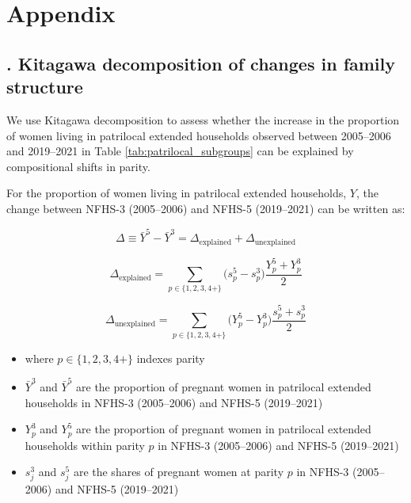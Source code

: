 \documentclass[10pt,twoside,reqno]{article}
\begin{document}
\section*{Appendix}

\setcounter{section}{0}
\renewcommand{\thesection}{\Alph{section}}

\setcounter{equation}{0}
\renewcommand{\theequation}{\thesection-\arabic{equation}}
\setcounter{figure}{0}
\renewcommand{\thefigure}{\thesection-\arabic{figure}}
\setcounter{table}{0}
\renewcommand{\thetable}{\thesection-\arabic{table}}

\subsection*{\thesection. Kitagawa decomposition of changes in family structure}
\label{sec:decomposition_parity}
We use Kitagawa decomposition \citep{kitagawa1955components} to assess whether the increase in the proportion of women living in patrilocal extended households observed between 2005--2006 and 2019--2021 in Table \ref{tab:patrilocal_subgroups} can be explained by compositional shifts in parity. 

For the proportion of women living in patrilocal extended households, $Y$, the change between NFHS-3 (2005--2006) and NFHS-5 (2019--2021) can be written as:

\begin{equation}
\Delta \equiv \bar Y^{5} - \bar Y^{3}
= \Delta_{\text{explained}} + \Delta_{\text{unexplained}}
\end{equation}

\begin{equation}
\Delta_{\text{explained}} =
\sum_{p \in \{1,2,3,4+\}} \big(s_p^{5} - s_p^{3}\big)\frac{Y_p^{5} + Y_p^{3}}{2}
\end{equation}

\begin{equation}
\Delta_{\text{unexplained}} =
\sum_{p \in \{1,2,3,4+\}} \big(Y_p^{5} - Y_p^{3}\big)\frac{s_p^{5} + s_p^{3}}{2}
\end{equation}



\begin{itemize}
    \item where $p \in \{1,2,3,4+\}$ indexes parity
    \item $\bar Y^{3}$ and $\bar Y^{5}$ are the proportion of pregnant women in patrilocal extended households in NFHS-3 (2005--2006) and NFHS-5 (2019--2021)
    \item $Y_p^{3}$ and $Y_p^{5}$ are the proportion of pregnant women in patrilocal extended households within parity $p$ in NFHS-3 (2005--2006) and NFHS-5 (2019--2021)
    \item $s_j^{3}$ and $s_j^{5}$ are the shares of pregnant women at parity $p$ in NFHS-3 (2005--2006) and NFHS-5 (2019--2021)
\end{itemize}
\end{document}
